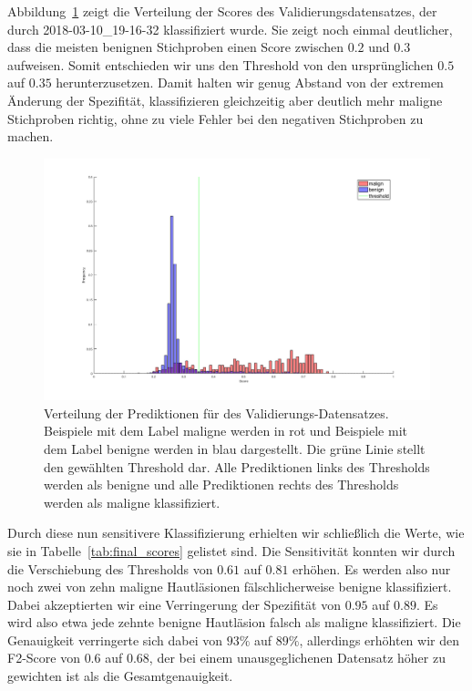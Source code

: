 Abbildung~\ref{fig:verteilung} zeigt die Verteilung der Scores des Validierungsdatensatzes, der durch 2018-03-10\_19-16-32 klassifiziert wurde. Sie zeigt noch einmal deutlicher, dass die meisten benignen Stichproben einen Score zwischen $0.2$ und $0.3$ aufweisen. Somit entschieden wir uns den Threshold von den ursprünglichen $0.5$ auf $0.35$ herunterzusetzen. Damit halten wir genug Abstand von der extremen Änderung der Spezifität, klassifizieren gleichzeitig aber deutlich mehr maligne Stichproben richtig, ohne zu viele Fehler bei den negativen Stichproben zu machen. 

\begin{figure}[htb!]
	\begin{center}
		\includegraphics[width=\textwidth]{pics/threshold/score_threshold.png}
		\caption{Verteilung der Prediktionen für des Validierungs-Datensatzes. Beispiele mit dem Label maligne werden in rot und Beispiele mit dem Label benigne werden in blau dargestellt. Die grüne Linie stellt den gewählten Threshold dar. Alle Prediktionen links des Thresholds werden als benigne und alle Prediktionen rechts des Thresholds werden als maligne klassifiziert.}
		\label{fig:verteilung}
    \end{center}
\end{figure}


Durch diese nun sensitivere Klassifizierung erhielten wir schließlich die Werte, wie sie in Tabelle~\ref{tab:final_scores} gelistet sind. Die Sensitivität konnten wir durch die Verschiebung des Thresholds von $0.61$ auf $0.81$ erhöhen. Es werden also nur noch zwei von zehn maligne Hautläsionen fälschlicherweise benigne klassifiziert. Dabei akzeptierten wir eine Verringerung der Spezifität von $0.95$ auf $0.89$. Es wird also etwa jede zehnte benigne Hautläsion falsch als maligne klassifiziert. Die Genauigkeit verringerte sich dabei von $93\%$ auf $89\%$, allerdings erhöhten wir den F2-Score von $0.6$ auf $0.68$, der bei einem unausgeglichenen Datensatz höher zu gewichten ist als die Gesamtgenauigkeit.


